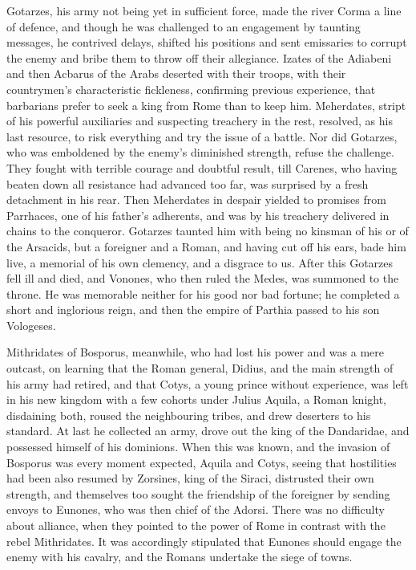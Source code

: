 Gotarzes, his army not being yet in sufficient force, made the river Corma a line of defence, and though he was challenged to an engagement by taunting messages, he contrived delays, shifted his positions and sent emissaries to corrupt the enemy and bribe them to throw off their allegiance. Izates of the Adiabeni and then Acbarus of the Arabs deserted with their troops, with their countrymen's characteristic fickleness, confirming previous experience, that barbarians prefer to seek a king from Rome than to keep him. Meherdates, stript of his powerful auxiliaries and suspecting treachery in the rest, resolved, as his last resource, to risk everything and try the issue of a battle. Nor did Gotarzes, who was emboldened by the enemy's diminished strength, refuse the challenge. They fought with terrible courage and doubtful result, till Carenes, who having beaten down all resistance had advanced too far, was surprised by a fresh detachment in his rear. Then Meherdates in despair yielded to promises from Parrhaces, one of his father's adherents, and was by his treachery delivered in chains to the conqueror. Gotarzes taunted him with being no kinsman of his or of the Arsacids, but a foreigner and a Roman, and having cut off his ears, bade him live, a memorial of his own clemency, and a disgrace to us. After this Gotarzes fell ill and died, and Vonones, who then ruled the Medes, was summoned to the throne. He was memorable neither for his good nor bad fortune; he completed a short and inglorious reign, and then the empire of Parthia passed to his son Vologeses.


Mithridates of Bosporus, meanwhile, who had lost his power and was a mere outcast, on learning that the Roman general, Didius, and the main strength of his army had retired, and that Cotys, a young prince without experience, was left in his new kingdom with a few cohorts under Julius Aquila, a Roman knight, disdaining both, roused the neighbouring tribes, and drew deserters to his standard. At last he collected an army, drove out the king of the Dandaridae, and possessed himself of his dominions. When this was known, and the invasion of Bosporus was every moment expected, Aquila and Cotys, seeing that hostilities had been also resumed by Zorsines, king of the Siraci, distrusted their own strength, and themselves too sought the friendship of the foreigner by sending envoys to Eunones, who was then chief of the Adorsi. There was no difficulty about alliance, when they pointed to the power of Rome in contrast with the rebel Mithridates. It was accordingly stipulated that Eunones should engage the enemy with his cavalry, and the Romans undertake the siege of towns.

